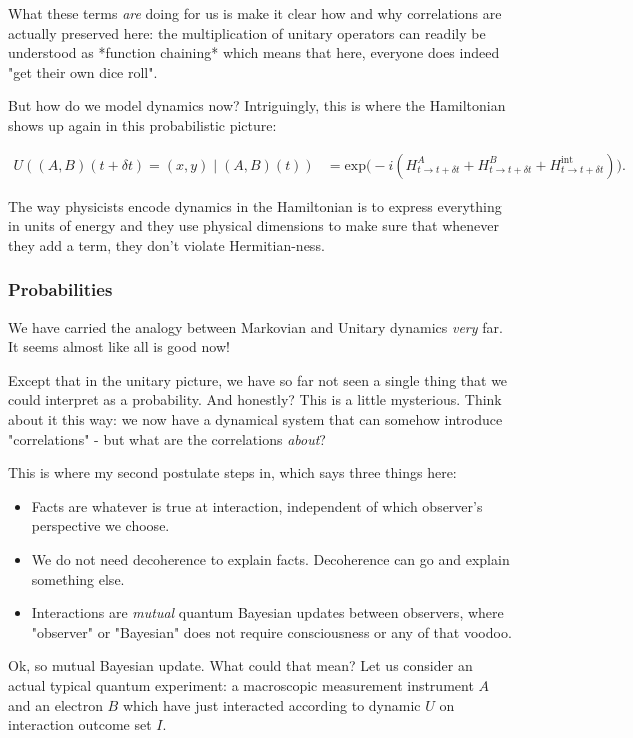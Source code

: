 \documentclass{article}
\begin{document}
What these terms \textit{are} doing for us is make it clear how and why correlations are actually preserved here: the multiplication of unitary operators can readily be understood as *function chaining* which means that here, everyone does indeed "get their own dice roll".

But how do we model dynamics now? Intriguingly, this is where the Hamiltonian shows up again in this probabilistic picture:

\begin{align*}
 U((A,B)(t+\delta t) = (x,y)\mid (A,B)(t)) &= \text{exp}\big (-i( H^A_{t \to t+\delta t} + H^B_{t \to t+\delta t} + H^{\text{int}}_{t \to t+\delta t}) \big ).
 \end{align*}

The way physicists encode dynamics in the Hamiltonian is to express everything in units of energy and they use physical dimensions to make sure that whenever they add a term, they don't violate Hermitian-ness.

\subsubsection{Probabilities}

We have carried the analogy between Markovian and Unitary dynamics \textit{very} far. It seems almost like all is good now!

Except that in the unitary picture, we have so far not seen a single thing that we could interpret as a probability. And honestly? This is a little mysterious. Think about it this way: we now have a dynamical system that can somehow introduce "correlations" - but what are the correlations \textit{about}?

This is where my second postulate steps in, which says three things here:
\begin{itemize}
\item Facts are whatever is true at interaction, independent of which observer's perspective we choose.
\item We do not need decoherence to explain facts. Decoherence can go and explain something else.
\item Interactions are \textit{mutual} quantum Bayesian updates between observers, where "observer" or "Bayesian" does not require consciousness or any of that voodoo.
\end{itemize}

Ok, so mutual Bayesian update. What could that mean? Let us consider an actual typical quantum experiment: a macroscopic measurement instrument $A$ and an electron $B$ which have just interacted according to dynamic $U$ on interaction outcome set $I$.
\end{document}
